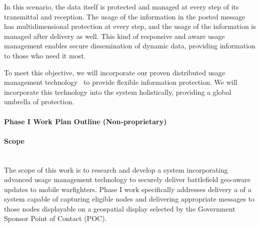 \documentclass{sbir}
\begin{document}
In this scenario, the data itself is protected and managed at every step of its transmittal and reception. The usage of the information in the posted message has multidimensional protection at every step, and the usage of the information is managed after delivery as well. This kind of responsive and aware usage management enables secure dissemination of dynamic data, providing information to those who need it most.

To meet this objective, we will incorporate our proven distributed usage management technology~\cite{HeHeShGiJa:11,JaHeLa:10,JaLaHe:11} to provide flexible information protection. We will incorporate this technology into the system holistically, providing a global umbrella of protection.


\newpage 
\lfoot{}
\cfoot{\color{LeTigre}\vspace*{-1.25em}{\scshape\fromproposaltitle}~\\ \rm\thepage}

\paragraph{Phase I Work Plan Outline (Non-proprietary)}
\paragraph{Scope}~\\
The scope of this work is to research and develop a system incorporating advanced usage management technology to securely deliver battlefield geo-aware updates to mobile warfighters. Phase I work specifically addresses delivery a of a system capable of capturing eligible nodes and delivering appropriate messages to those nodes displayable on a geospatial display selected by the Government Sponsor Point of Contact (POC). %
\end{document}
